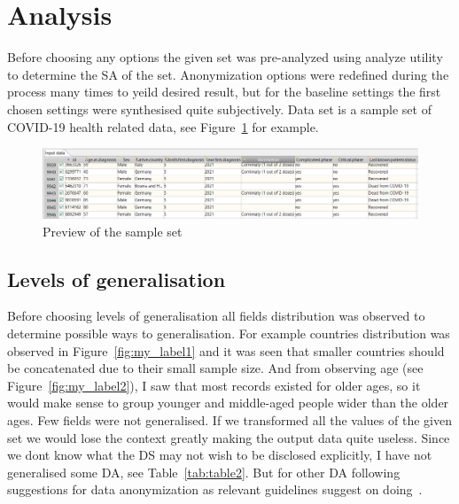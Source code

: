 
\newpage


\section{Analysis}

Before choosing any options the given set was pre-analyzed using analyze utility to determine the \ac{SA} of the set.
Anonymization options were redefined during the process many times to yeild desired result, but for the baseline settings the first chosen
settings were synthesised quite subjectively. Data set is a sample set of COVID-19 health related data, see Figure~\ref{fig:my_label3}
for example.

\begin{figure}[ht]
  \centering
  \includegraphics[width=\textwidth, keepaspectratio]{assets/sample_data}
  \caption{Preview of the sample set}
  \label{fig:my_label3}
\end{figure}

\subsection{Levels of generalisation}

Before choosing levels of generalisation all fields distribution was observed to determine possible ways to generalisation. For example
countries distribution was observed in Figure~\ref{fig:my_label1} and it was seen that smaller countries should be concatenated due to their
small sample size. And from observing age (see Figure~\ref{fig:my_label2}), I saw that most records existed for older ages, so
it
would make sense to
group younger and middle-aged people wider than the older ages. Few fields were not generalised. If we transformed all the values of the
given set we would lose the context greatly making the output data quite useless. Since we dont know what the \ac{DS} may not wish to be
disclosed explicitly, I have not generalised some \ac{DA}, see Table~\ref{tab:table2}. But for other \ac{DA} following suggestions for
data anonymization
as relevant guidelines suggest on doing~\cite[]{www.operando.eu}.


